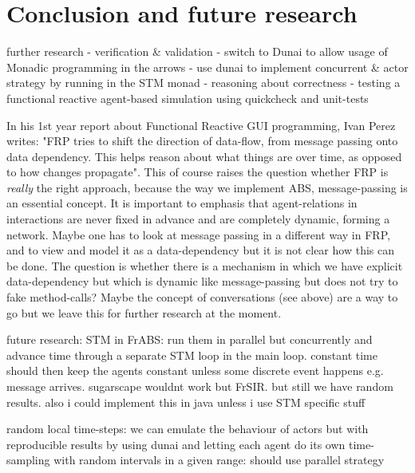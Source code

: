 \section{Conclusion and future research}

further research
	- verification \& validation
	- switch to Dunai to allow usage of Monadic programming in the arrows
	- use dunai to implement concurrent \& actor strategy by running in the STM monad
	- reasoning about correctness
	- testing a functional reactive agent-based simulation using quickcheck and unit-tests
	
In his 1st year report about Functional Reactive GUI programming, Ivan Perez writes: "FRP tries to shift the direction of data-flow, from message passing onto data dependency. This helps reason about what things are over time, as opposed to how changes propagate". This of course raises the question whether FRP is \textit{really} the right approach, because the way we implement ABS, message-passing is an essential concept. It is important to emphasis that agent-relations in interactions are never fixed in advance and are completely dynamic, forming a network. Maybe one has to look at message passing in a different way in FRP, and to view and model it as a data-dependency but it is not clear how this can be done. The question is whether there is a mechanism in which we have explicit data-dependency but which is dynamic like message-passing but does not try to fake method-calls? Maybe the concept of conversations (see above) are a way to go but we leave this for further research at the moment.

future research: STM in FrABS: run them in parallel but concurrently and advance time through a separate STM loop in the main loop. constant time should then keep the agents constant unless some discrete event happens e.g. message arrives. sugarscape wouldnt work but FrSIR. but still we have random results. also i could implement this in java unless i use STM specific stuff

random local time-steps: we can emulate the behaviour of actors but with reproducible results by using dunai and letting each agent do its own time-sampling with random intervals in a given range: should use parallel strategy

